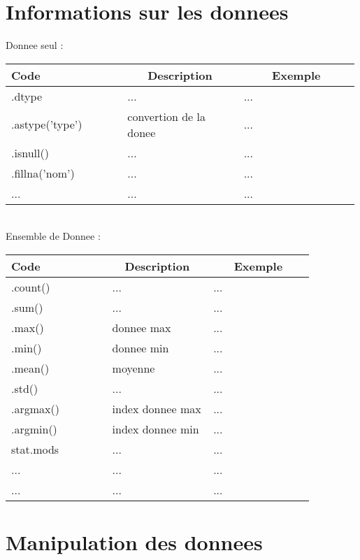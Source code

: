 \documentclass{article}
\begin{document}
    \section*{Informations sur les donnees}

	Donnee seul : \\
    \noindent
    \begin{tabular}{|p{0.33\linewidth}|p{0.33\linewidth}|p{0.33\linewidth}|}
	\hline
	\multicolumn{1}{|l|}{Code} &
	\multicolumn{1}{c|}{Description} &
	\multicolumn{1}{c|}{Exemple} \\ \hline
	.dtype & ... & ... \\ \hline
	.astype('type') & convertion de la donee & ... \\ \hline
	.isnull() & ... & ... \\ \hline
	.fillna('nom') & ... & ... \\ \hline		
	... & ... & ...  \\ 
	\hline
	\end{tabular}
	

	\noindent
	\\Ensemble de Donnee : \\
	\noindent
    \begin{tabular}{|p{0.33\linewidth}|p{0.33\linewidth}|p{0.33\linewidth}|}
	\hline
	\multicolumn{1}{|l|}{Code} &
	\multicolumn{1}{c|}{Description} &
	\multicolumn{1}{c|}{Exemple} \\ \hline
	.count() & ... & ... \\ \hline
	.sum() & ... & ... \\ \hline
	.max() & donnee max & ... \\ \hline
	.min() & donnee min & ... \\ \hline
	.mean() & moyenne & ... \\ \hline
	.std() & ... & ... \\ \hline
	.argmax() & index donnee max & ... \\ \hline
	.argmin() & index donnee min & ... \\ \hline
	stat.mods & ... & ... \\ \hline
	... & ... & ... \\ \hline
	... & ... & ... \\ 
	\hline
	\end{tabular}
	
	 \section*{Manipulation des donnees}
  
\end{document}
